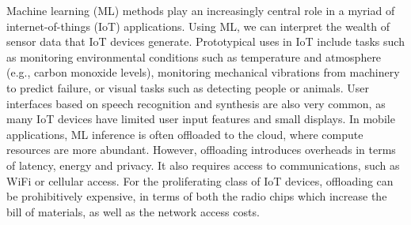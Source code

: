 \documentclass{article}
\begin{document}
Machine learning (ML) methods play an increasingly central role in a myriad of internet-of-things (IoT) applications.
Using ML, we can interpret the wealth of sensor data that IoT devices generate.
Prototypical uses in IoT include tasks such as monitoring environmental conditions such as temperature and atmosphere (e.g., carbon monoxide levels), monitoring mechanical vibrations from machinery to predict failure, or visual tasks such as detecting people or animals.
User interfaces based on speech recognition and synthesis are also very common, as many IoT devices have limited user input features and small displays.
In mobile applications, ML inference is often offloaded to the cloud, where compute resources are more abundant.
However, offloading introduces overheads in terms of latency, energy and privacy.
It also requires access to communications, such as WiFi or cellular access.
For the proliferating class of IoT devices, offloading can be prohibitively expensive, in terms of both the radio chips which increase the bill of materials, as well as the network access costs.
\end{document}
